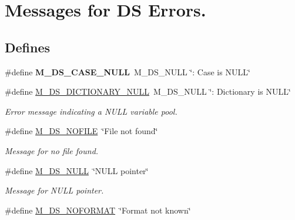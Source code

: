 \hypertarget{group___m___d_s___messages}{
\section{Messages for DS Errors.}
\label{group___m___d_s___messages}
}
\subsection*{Defines}
\begin{DoxyCompactItemize}
\item 
\hypertarget{group___m___d_s___messages_ga705c3e02cba93cfcf85ba8ad7777b054}{
\#define {\bfseries M\_\-DS\_\-CASE\_\-NULL}~M\_\-DS\_\-NULL \char`\"{}: Case is NULL\char`\"{}}
\label{group___m___d_s___messages_ga705c3e02cba93cfcf85ba8ad7777b054}

\item 
\hypertarget{group___m___d_s___messages_ga37fa683598c03113c9d9667a1c0f7a9c}{
\#define \hyperlink{group___m___d_s___messages_ga37fa683598c03113c9d9667a1c0f7a9c}{M\_\-DS\_\-DICTIONARY\_\-NULL}~M\_\-DS\_\-NULL \char`\"{}: Dictionary is NULL\char`\"{}}
\label{group___m___d_s___messages_ga37fa683598c03113c9d9667a1c0f7a9c}

\begin{DoxyCompactList}\small\item\em Error message indicating a NULL variable pool. \item\end{DoxyCompactList}\item 
\hypertarget{group___m___d_s___messages_gadd043ccc956aaee49b9c646f940c167b}{
\#define \hyperlink{group___m___d_s___messages_gadd043ccc956aaee49b9c646f940c167b}{M\_\-DS\_\-NOFILE}~\char`\"{}File not found\char`\"{}}
\label{group___m___d_s___messages_gadd043ccc956aaee49b9c646f940c167b}

\begin{DoxyCompactList}\small\item\em Message for no file found. \item\end{DoxyCompactList}\item 
\hypertarget{group___m___d_s___messages_ga0d502db70be066b76fa94dc1eb9ef75c}{
\#define \hyperlink{group___m___d_s___messages_ga0d502db70be066b76fa94dc1eb9ef75c}{M\_\-DS\_\-NULL}~\char`\"{}NULL pointer\char`\"{}}
\label{group___m___d_s___messages_ga0d502db70be066b76fa94dc1eb9ef75c}

\begin{DoxyCompactList}\small\item\em Message for NULL pointer. \item\end{DoxyCompactList}\item 
\hypertarget{group___m___d_s___messages_ga05191be522c29caa6f80baddfb2a109c}{
\#define \hyperlink{group___m___d_s___messages_ga05191be522c29caa6f80baddfb2a109c}{M\_\-DS\_\-NOFORMAT}~\char`\"{}Format not known\char`\"{}}
\label{group___m___d_s___messages_ga05191be522c29caa6f80baddfb2a109c}


\end{DoxyCompactItemize}
